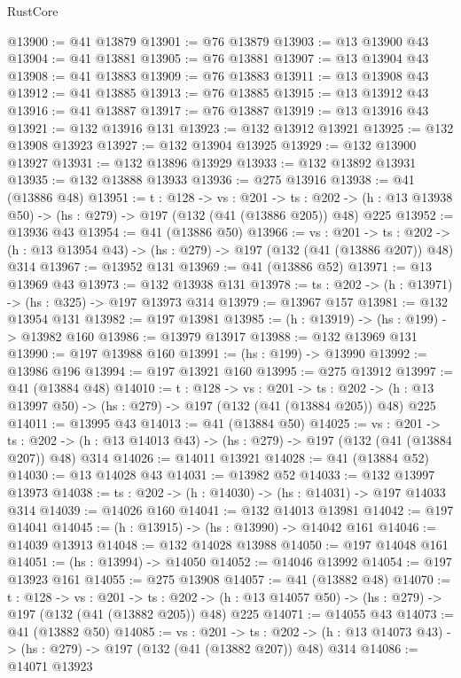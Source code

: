 \begin{lexlean}{RustCore}
\begin{coremodule}
@13900 := @41 @13879
@13901 := @76 @13879
@13903 := @13 @13900 @43
@13904 := @41 @13881
@13905 := @76 @13881
@13907 := @13 @13904 @43
@13908 := @41 @13883
@13909 := @76 @13883
@13911 := @13 @13908 @43
@13912 := @41 @13885
@13913 := @76 @13885
@13915 := @13 @13912 @43
@13916 := @41 @13887
@13917 := @76 @13887
@13919 := @13 @13916 @43
@13921 := @132 @13916 @131
@13923 := @132 @13912 @13921
@13925 := @132 @13908 @13923
@13927 := @132 @13904 @13925
@13929 := @132 @13900 @13927
@13931 := @132 @13896 @13929
@13933 := @132 @13892 @13931
@13935 := @132 @13888 @13933
@13936 := @275 @13916
@13938 := @41 (@13886 @48)
@13951 := {t : @128} ->
  {vs : @201} ->
  {ts : @202} -> (h : @13 @13938 @50) -> (hs : @279) -> @197 (@132 (@41 (@13886 @205)) @48) @225
@13952 := @13936 @43
@13954 := @41 (@13886 @50)
@13966 := {vs : @201} ->
  {ts : @202} -> (h : @13 @13954 @43) -> (hs : @279) -> @197 (@132 (@41 (@13886 @207)) @48) @314
@13967 := @13952 @131
@13969 := @41 (@13886 @52)
@13971 := @13 @13969 @43
@13973 := @132 @13938 @131
@13978 := {ts : @202} -> (h : @13971) -> (hs : @325) -> @197 @13973 @314
@13979 := @13967 @157
@13981 := @132 @13954 @131
@13982 := @197 @13981
@13985 := (h : @13919) -> (hs : @199) -> @13982 @160
@13986 := @13979 @13917
@13988 := @132 @13969 @131
@13990 := @197 @13988 @160
@13991 := (hs : @199) -> @13990
@13992 := @13986 @196
@13994 := @197 @13921 @160
@13995 := @275 @13912
@13997 := @41 (@13884 @48)
@14010 := {t : @128} ->
  {vs : @201} ->
  {ts : @202} -> (h : @13 @13997 @50) -> (hs : @279) -> @197 (@132 (@41 (@13884 @205)) @48) @225
@14011 := @13995 @43
@14013 := @41 (@13884 @50)
@14025 := {vs : @201} ->
  {ts : @202} -> (h : @13 @14013 @43) -> (hs : @279) -> @197 (@132 (@41 (@13884 @207)) @48) @314
@14026 := @14011 @13921
@14028 := @41 (@13884 @52)
@14030 := @13 @14028 @43
@14031 := @13982 @52
@14033 := @132 @13997 @13973
@14038 := {ts : @202} -> (h : @14030) -> (hs : @14031) -> @197 @14033 @314
@14039 := @14026 @160
@14041 := @132 @14013 @13981
@14042 := @197 @14041
@14045 := (h : @13915) -> (hs : @13990) -> @14042 @161
@14046 := @14039 @13913
@14048 := @132 @14028 @13988
@14050 := @197 @14048 @161
@14051 := (hs : @13994) -> @14050
@14052 := @14046 @13992
@14054 := @197 @13923 @161
@14055 := @275 @13908
@14057 := @41 (@13882 @48)
@14070 := {t : @128} ->
  {vs : @201} ->
  {ts : @202} -> (h : @13 @14057 @50) -> (hs : @279) -> @197 (@132 (@41 (@13882 @205)) @48) @225
@14071 := @14055 @43
@14073 := @41 (@13882 @50)
@14085 := {vs : @201} ->
  {ts : @202} -> (h : @13 @14073 @43) -> (hs : @279) -> @197 (@132 (@41 (@13882 @207)) @48) @314
@14086 := @14071 @13923

\end{coremodule}
\end{lexlean}
